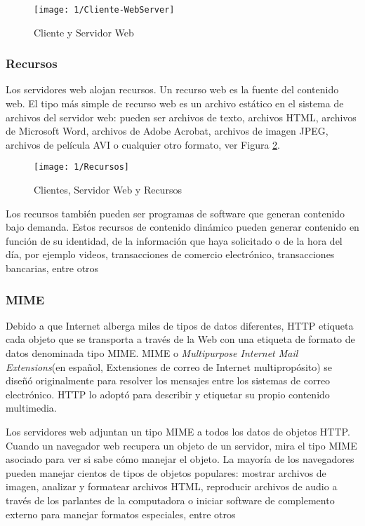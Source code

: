 	\begin{figure} %
				\begin{center}
		\texttt{[image: 1/Cliente-WebServer]}
		\caption{Cliente y Servidor Web}
		\label{fig:CSweb}
				\end{center}
	\end{figure}
	
	
	\subsubsection{Recursos}   
	Los servidores web alojan \gls{recursos}. Un recurso web es la fuente del contenido web. El tipo más simple de recurso web es un archivo estático en el sistema de archivos del servidor web: pueden ser archivos de texto, archivos HTML, archivos de Microsoft Word, archivos de Adobe Acrobat, archivos de imagen JPEG, archivos de película AVI o cualquier otro formato, ver Figura \ref{fig:CS-Recursos}.
	
		\begin{figure} [h] %
					\begin{center}
		\texttt{[image: 1/Recursos]}
		\caption{Clientes, Servidor Web y Recursos }
		\label{fig:CS-Recursos}
				\end{center}
	\end{figure}

	Los recursos también pueden ser programas de software que generan contenido bajo demanda. Estos recursos de contenido dinámico pueden generar contenido en función de su identidad, de la información que haya solicitado o de la hora del día, por ejemplo videos, transacciones de comercio electrónico, transacciones bancarias, entre otros
	

	
	\subsubsection{MIME}  
	Debido a que Internet alberga  miles de tipos de datos diferentes, HTTP etiqueta  cada objeto que se transporta a través de la Web con una etiqueta de formato de datos denominada tipo MIME. \gls{MIME} o \textit{Multipurpose Internet Mail Extensions}(en español, Extensiones de correo de Internet multipropósito) se diseñó originalmente para resolver los mensajes entre los sistemas de correo electrónico. HTTP lo adoptó para describir y etiquetar su propio contenido multimedia.
	
	Los servidores web adjuntan un tipo MIME a todos los datos de objetos HTTP. Cuando un navegador web recupera un objeto de un servidor, mira el tipo MIME asociado para ver si sabe cómo manejar el objeto. La mayoría de los navegadores pueden manejar cientos de tipos de objetos populares: mostrar archivos de imagen, analizar y formatear archivos HTML, reproducir archivos de audio a través de los parlantes de la computadora o iniciar software de complemento externo para manejar formatos especiales, entre otros
	
